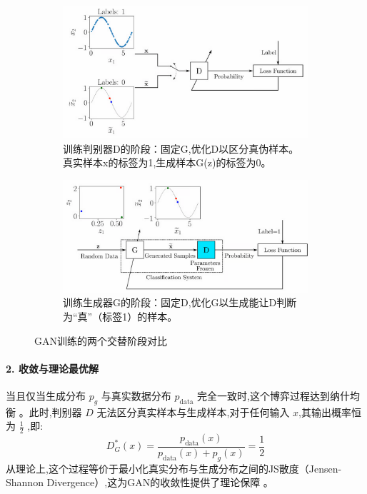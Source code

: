 \begin{itemize}
    \begin{figure}[htbp]
        \centering
        \begin{subfigure}[b]{0.48\textwidth}
            \centering
            \includegraphics[width=\textwidth]{figures/GAN5.png}
            \caption{训练判别器D的阶段：固定G,优化D以区分真伪样本。真实样本x的标签为1,生成样本G(z)的标签为0。}
            \label{fig:gan_train_discriminator}
        \end{subfigure}
        \hfill
        \begin{subfigure}[b]{0.48\textwidth}
            \centering
            \includegraphics[width=\textwidth]{figures/GAN6.png}
            \caption{训练生成器G的阶段：固定D,优化G以生成能让D判断为“真”（标签1）的样本。}
            \label{fig:gan_train_generator}
        \end{subfigure}
        \caption{GAN训练的两个交替阶段对比}
        \label{fig:gan_training_phases}
    \end{figure}

    \paragraph{2. 收敛与理论最优解}
    当且仅当生成分布 $p_g$ 与真实数据分布 $p_{\text{data}}$ 完全一致时,这个博弈过程达到纳什均衡 \cite{89}。此时,判别器 $D$ 无法区分真实样本与生成样本,对于任何输入 $x$,其输出概率恒为 $\frac{1}{2}$ ,即:
    $$ D_{G}^{*}(x) = \frac{p_{\text{data}}(x)}{p_{\text{data}}(x) + p_{g}(x)} = \frac{1}{2} $$
    从理论上,这个过程等价于最小化真实分布与生成分布之间的JS散度（Jensen-Shannon Divergence）,这为GAN的收敛性提供了理论保障 \cite{90}。
    

\end{itemize}
